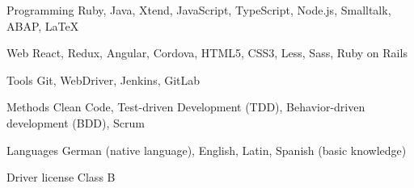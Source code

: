 

\begin{cvskills}

  \cvskill
    {Programming} %
    {Ruby, Java, Xtend, JavaScript, TypeScript, Node.js, Smalltalk, ABAP, \LaTeX} %

  \cvskill
    {Web} %
    {React, Redux, Angular, Cordova, HTML5, CSS3, Less, Sass, Ruby on Rails} %

  \cvskill
    {Tools} %
    {Git, WebDriver, Jenkins, GitLab} %

  \cvskill
    {Methods} %
    {Clean Code, Test-driven Development (TDD), Behavior-driven development (BDD), Scrum} %

  \cvskill
    {Languages} %
    {German (native language), English, Latin, Spanish (basic knowledge)} %

  \cvskill
    {Driver license} %
    {Class B} %

\end{cvskills}
